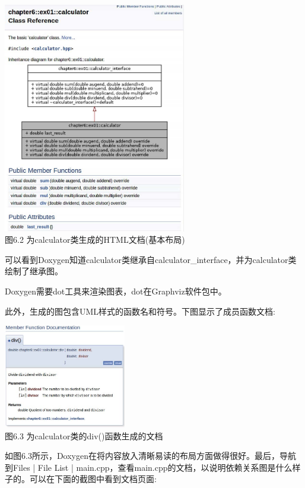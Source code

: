 \begin{center}
\includegraphics[width=0.6\textwidth]{content/2/chapter6/images/2.jpg}\\
图6.2 为calculator类生成的HTML文档(基本布局)
\end{center}

可以看到Doxygen知道calculator类继承自calculator\_interface，并为calculator类绘制了继承图。

\begin{tcolorbox}[colback=webgreen!5!white,colframe=webgreen!75!black,title=Note]
Doxygen需要dot工具来渲染图表，dot在Graphviz软件包中。
\end{tcolorbox}

此外，生成的图包含UML样式的函数名和符号。下图显示了成员函数文档:

\begin{center}
\includegraphics[width=0.4\textwidth]{content/2/chapter6/images/3.jpg}\\
图6.3 为calculator类的div()函数生成的文档
\end{center}

如图6.3所示，Doxygen在将内容放入清晰易读的布局方面做得很好。最后，导航到Files | File List | main.cpp，查看main.cpp的文档，以说明依赖关系图是什么样子的。可以在下面的截图中看到文档页面:

